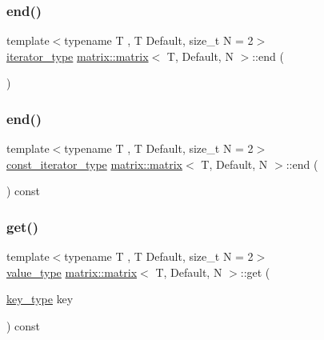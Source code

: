 \subsubsection{\texorpdfstring{end()}{end()}\hspace{0.1cm}{\footnotesize\ttfamily [1/2]}}
{\footnotesize\ttfamily template$<$typename T , T Default, size\+\_\+t N = 2$>$ \\
\hyperlink{structmatrix_1_1matrix_a82eef2feb50cdf62ced121fb74d3bc67}{iterator\+\_\+type} \hyperlink{structmatrix_1_1matrix}{matrix\+::matrix}$<$ T, Default, N $>$\+::end (\begin{DoxyParamCaption}{ }\end{DoxyParamCaption})\hspace{0.3cm}{\ttfamily [inline]}}

\mbox{\label{structmatrix_1_1matrix_ab1fae4edfc6c0cd8d0b0fa2c164bb0f4}} 
\subsubsection{\texorpdfstring{end()}{end()}\hspace{0.1cm}{\footnotesize\ttfamily [2/2]}}
{\footnotesize\ttfamily template$<$typename T , T Default, size\+\_\+t N = 2$>$ \\
\hyperlink{structmatrix_1_1matrix_a22035dd29cc89014fbb33fd37bfeac93}{const\+\_\+iterator\+\_\+type} \hyperlink{structmatrix_1_1matrix}{matrix\+::matrix}$<$ T, Default, N $>$\+::end (\begin{DoxyParamCaption}{ }\end{DoxyParamCaption}) const\hspace{0.3cm}{\ttfamily [inline]}}

\mbox{\label{structmatrix_1_1matrix_a312aeb3131a45703593dd29558dc54da}} 
\subsubsection{\texorpdfstring{get()}{get()}}
{\footnotesize\ttfamily template$<$typename T , T Default, size\+\_\+t N = 2$>$ \\
\hyperlink{structmatrix_1_1matrix_ab940e7a84942339cdee7c0f0d3bd8ef9}{value\+\_\+type} \hyperlink{structmatrix_1_1matrix}{matrix\+::matrix}$<$ T, Default, N $>$\+::get (\begin{DoxyParamCaption}\item[{\hyperlink{structmatrix_1_1matrix_af7b5498ac1b615cb9ef51bd185a2557e}{key\+\_\+type}}]{key }\end{DoxyParamCaption}) const\hspace{0.3cm}{\ttfamily [inline]}}

